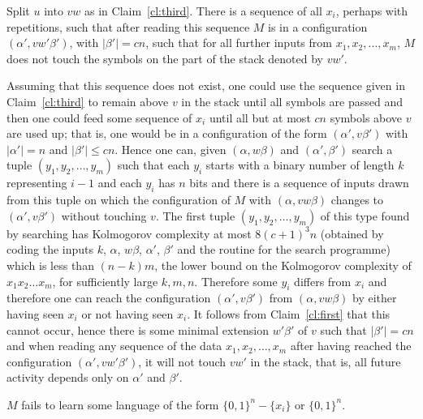 \documentclass{LMCS}
\theoremstyle{plain}\newtheorem{athm}[thm]{Theorem}
\theoremstyle{plain}\newtheorem{aprop}[thm]{Proposition}
\theoremstyle{plain}\newtheorem{aprob}[thm]{Open Problem}
\theoremstyle{plain}\newtheorem{acor}[thm]{Corollary}
\theoremstyle{plain}\newtheorem{alem}[thm]{Lemma}
\theoremstyle{definition}\newtheorem{adefn}[thm]{Definition}
\theoremstyle{definition}\newtheorem{arem}[thm]{Remark}
\theoremstyle{plain}\newtheorem{aexmp}[thm]{Example}
\theoremstyle{plain}\newtheorem{aclm}[thm]{Claim}
\begin{document}
\begin{clm} \label{cl:fourth}
Split $u$ into $vw$ as in Claim~\ref{cl:third}. There is a sequence
of all $x_i$, perhaps with repetitions, such that after reading this
sequence $M$ is in a configuration $(\alpha',vw'\beta')$, with $|\beta'|=cn$, 
such that for all further
inputs from $x_1,x_2,\ldots,x_m$, $M$ does not touch the symbols on the
part of the stack denoted by $vw'$.
\end{clm}

\noindent
Assuming that this sequence does not exist, one could use the sequence
given in Claim~\ref{cl:third} to remain above $v$ in the stack until all
symbols are passed and then one could feed some sequence of $x_i$ until
all but at most $cn$ symbols above $v$ are used up; that is, one would
be in a configuration of the form $(\alpha',v\beta')$ with $|\alpha'| = n$ and
$|\beta'| \leq cn$. Hence one can, given $(\alpha,w\beta)$ and
$(\alpha',\beta')$ search a
tuple $(y_1,y_2,\ldots,y_m)$ such that each $y_i$ starts with a binary
number of length $k$ representing $i-1$ and each $y_i$ has $n$ bits
and there is a sequence of inputs drawn from this tuple on which the
configuration of $M$ with $(\alpha,vw\beta)$ changes to
$(\alpha',v\beta')$ without
touching $v$. The first tuple $(y_1,y_2,\ldots,y_m)$ of this type
found by searching has Kolmogorov complexity at most
$8(c+1)^3n$ (obtained by coding the inputs $k$, $\alpha$, $w\beta$,
$\alpha'$, $\beta'$ and
the routine for the search programme) which is less than 
$(n-k)m$, the lower bound on the 
Kolmogorov complexity of $x_1 x_2 \ldots x_m$, for sufficiently large $k,m,n$.
Therefore some $y_i$ differs from $x_i$ and therefore one can reach
the configuration $(\alpha',v\beta')$ from $(\alpha,vw\beta)$ by
either having seen
$x_i$ or not having seen $x_i$. It follows from Claim~\ref{cl:first}
that this cannot occur, hence there is some minimal extension $w'\beta'$
of $v$ such that $|\beta'| = cn$ and when reading any sequence of the
data $x_1,x_2,\ldots,x_m$ after having reached the
configuration $(\alpha',vw'\beta')$, it will not touch $vw'$ in the stack,
that is, all future activity depends only on $\alpha'$ and $\beta'$.

\begin{clm} \label{cl:fifth}
$M$ fails to learn some language of the form
$\{0,1\}^n-\{x_i\}$ or $\{0,1\}^n$.
\end{clm}
\end{document}
